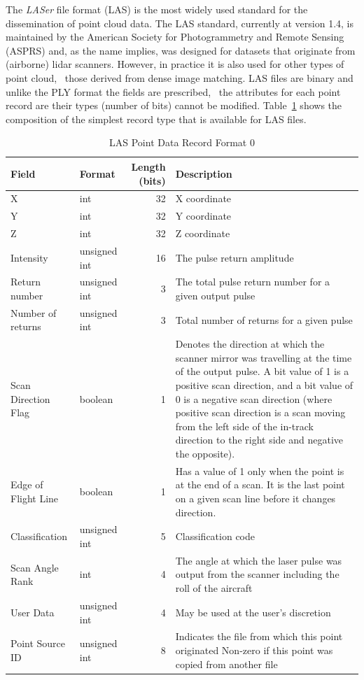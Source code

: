 The \emph{LASer} file format (LAS) is the most widely used standard for the dissemination of point cloud data.
The LAS standard, currently at version 1.4, is maintained by the American Society for Photogrammetry and Remote Sensing (ASPRS) and, as the name implies, was designed for datasets that originate from (airborne) lidar scanners.
However, in practice it is also used for other types of point cloud, \eg\ those derived from dense image matching.
LAS files are binary and unlike the PLY format the fields are prescribed, \ie\ the attributes for each point record are their types (number of bits) cannot be modified.
Table~\ref{tab:las-record} shows the composition of the simplest record type that is available for LAS files.
\begin{table}
  \centering
  \small
  \begin{tabular}{l|l|r|p{7cm}}
    Field & Format & Length (bits) & Description\\ \midrule
    X & int & 32 & X coordinate \\ 
    Y & int & 32 & Y coordinate \\ 
    Z & int & 32 & Z coordinate \\ 
    Intensity & unsigned int & 16 & The pulse return amplitude \\ 
    Return number & unsigned int & 3 &  The total pulse return number for a given output pulse \\ 
    Number of returns & unsigned int & 3 & Total number of returns for a given pulse \\ 
    Scan Direction Flag & boolean & 1 & Denotes the direction at which the scanner mirror was travelling at the time of the output pulse. A bit value of 1 is a positive scan direction, and a bit value of 0 is a negative scan direction (where positive scan direction is a scan moving from the left side of the in-track direction to the right side and negative the opposite).  \\ 
    Edge of Flight Line & boolean & 1 & Has a value of 1 only when the point is at the end of a scan. It is the last point on a given scan line before it changes direction. \\ 
    Classification & unsigned int & 5 & Classification code \\ 
    Scan Angle Rank & int & 4 & The angle at which the laser pulse was output from the scanner including the roll of the aircraft \\ 
    User Data & unsigned int & 4 & May be used at the user's discretion \\ 
    Point Source ID & unsigned int & 8 & Indicates the file from which this point originated Non-zero if this point was copied from another file
  \end{tabular}
\caption{LAS Point Data Record Format 0}%
\label{tab:las-record}
\end{table}
